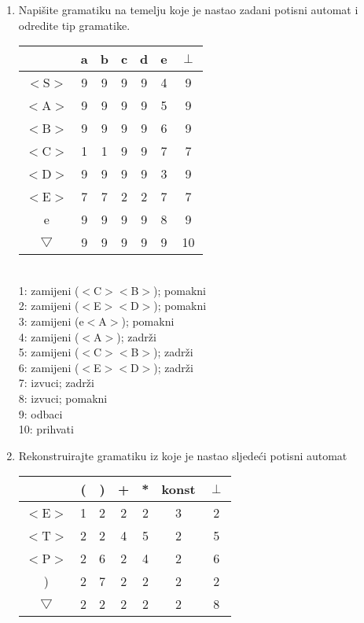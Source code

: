 \documentclass[times, 12pt, utf8]{book}
\begin{document}
\begin{enumerate}[resume]
\item
Napišite gramatiku na temelju koje je nastao zadani potisni automat i odredite tip gramatike. \cite[str.~85-99]{udzbenik} \cite{auditorne}

\begin{tabular}{ | c | c | c | c | c | c | c | } \hline
 & a & b & c & d & e & $\perp$ \\ \hline
$<$S$>$ & 9 & 9 & 9 & 9 & 4 & 9 \\ \hline
$<$A$>$ & 9 & 9 & 9 & 9 & 5 & 9 \\ \hline
$<$B$>$ & 9 & 9 & 9 & 9 & 6 & 9 \\ \hline
$<$C$>$ & 1 & 1 & 9 & 9 & 7 & 7 \\ \hline
$<$D$>$ & 9 & 9 & 9 & 9 & 3 & 9 \\ \hline
$<$E$>$ & 7 & 7 & 2 & 2 & 7 & 7 \\ \hline
e & 9 & 9 & 9 & 9 & 8 & 9  \\ \hline
$\bigtriangledown$ & 9 & 9 & 9 & 9 & 9 & 10 \\ \hline
\end{tabular}
\\

 1: zamijeni ($<$C$>$$<$B$>$); pomakni \\
 2: zamijeni ($<$E$>$$<$D$>$); pomakni \\
 3: zamijeni (e$<$A$>$);   pomakni \\
 4: zamijeni ($<$A$>$);    zadrži \\
 5: zamijeni ($<$C$>$$<$B$>$); zadrži \\
 6: zamijeni ($<$E$>$$<$D$>$); zadrži \\
 7: izvuci;            zadrži \\
 8: izvuci;            pomakni \\
 9: odbaci \\
10: prihvati \\

\item
Rekonstruirajte gramatiku iz koje je nastao sljedeći potisni automat \cite[str.~85-99]{udzbenik} \cite{auditorne}

\begin{tabular}{|c|c|c|c|c|c|c|} \hline
& ( & ) & + & * & konst & $\perp$ \\ \hline
$<$E$>$ & 1 & 2 & 2 & 2 & 3 & 2 \\ \hline
$<$T$>$ & 2 & 2 & 4 & 5 & 2 & 5 \\ \hline
$<$P$>$ & 2 & 6 & 2 & 4 & 2 & 6 \\ \hline
) & 2 & 7 & 2 & 2 & 2 & 2 \\ \hline
$\bigtriangledown$ & 2 & 2 & 2 & 2 & 2 & 8 \\ \hline
\end{tabular}


\end{enumerate}
\end{document}
